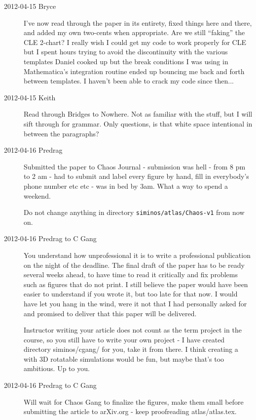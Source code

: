 \begin{description}
\item[2012-04-15 Bryce] I've now read through the paper in its entirety, fixed things here and there, and added my own two-cents when appropriate. Are we still ``faking'' the CLE 2-chart? I really wish I could get my code to work properly for CLE but I spent hours trying to avoid the discontinuity with the various templates Daniel cooked up but the break conditions I was using in Mathematica's integration routine ended up bouncing me back and forth between templates. I haven't been able to crack my code since then...

\item[2012-04-15 Keith] Read through Bridges to Nowhere.  Not as familiar with the stuff, but I will sift through for grammar.  Only questions, is that white space intentional in between the paragraphs?

\item[2012-04-16 Predrag] Submitted the paper to Chaos Journal -
submission was hell - from 8 pm to 2 am - had to submit and label every
figure by hand, fill in everybody's phone number etc etc - was in bed by
3am. What a way to spend a weekend.

Do not change anything in directory \texttt{siminos/atlas/Chaos-v1} from
now on.

\item[2012-04-16 Predrag to C Gang]
You understand how unprofessional it is to write a professional
publication on the night of the deadline. The final draft of the paper
has to be ready several weeks ahead, to have time to read it critically
and fix problems such as figures that do not print. I still believe the
paper would have been easier to understand if you wrote it, but too late
for that now. I would have let you hang in the wind, were it not that I
had personally asked for and promised to deliver that this paper will be
delivered.

Instructor writing your article does not count as the term project in the
course, so you still have to write your own project - I have created
directory siminos/cgang/ for you, take it from there. I think creating a
 with 3D rotatable
simulations would be fun, but maybe that's too ambitious. Up to you.


\item[2012-04-16 Predrag to C Gang]
Will wait for Chaos Gang to finalize the figures, make them small before
submitting the article to arXiv.org - keep proofreading atlas/atlas.tex.


\end{description}
